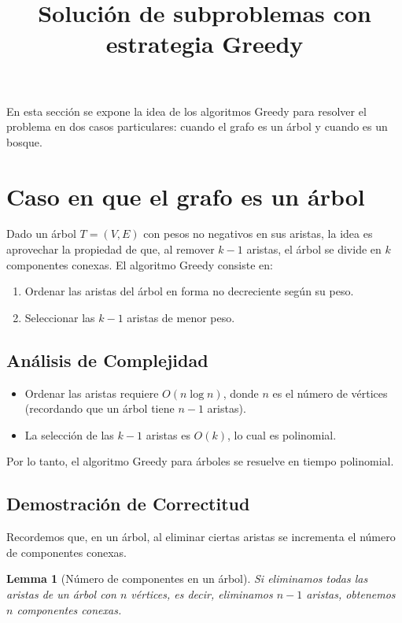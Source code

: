 \documentclass[12pt]{article}
\title{Solución de subproblemas con estrategia Greedy}
\author{}
\date{}
\newtheorem{lemma}{Lemma}
\begin{document}
\maketitle

En esta sección se expone la idea de los algoritmos Greedy para resolver el problema en dos casos particulares: cuando el grafo es un árbol y cuando es un bosque.

\section{Caso en que el grafo es un árbol}


Dado un árbol \( T = (V,E) \) con pesos no negativos en sus aristas, la idea es aprovechar la propiedad de que, al remover \( k-1 \) aristas, el árbol se divide en \( k \) componentes conexas. El algoritmo Greedy consiste en:
\begin{enumerate}
    \item Ordenar las aristas del árbol en forma no decreciente según su peso.
    \item Seleccionar las \( k-1 \) aristas de menor peso.
\end{enumerate}
\subsection{Análisis de Complejidad}
\begin{itemize}
    \item Ordenar las aristas requiere \( O(n \log n) \), donde \( n \) es el número de vértices (recordando que un árbol tiene \( n-1 \) aristas).
    \item La selección de las \( k-1 \) aristas es \( O(k) \), lo cual es polinomial.
\end{itemize}
Por lo tanto, el algoritmo Greedy para árboles se resuelve en tiempo polinomial.

\subsection{Demostración de Correctitud}

Recordemos que, en un árbol, al eliminar ciertas aristas se incrementa el número de componentes conexas.

\begin{lemma}[Número de componentes en un árbol]
Si eliminamos todas las aristas de un árbol con \( n \) vértices, es decir, eliminamos \( n-1 \) aristas, obtenemos \( n \) componentes conexas.
\end{lemma}
\end{document}

